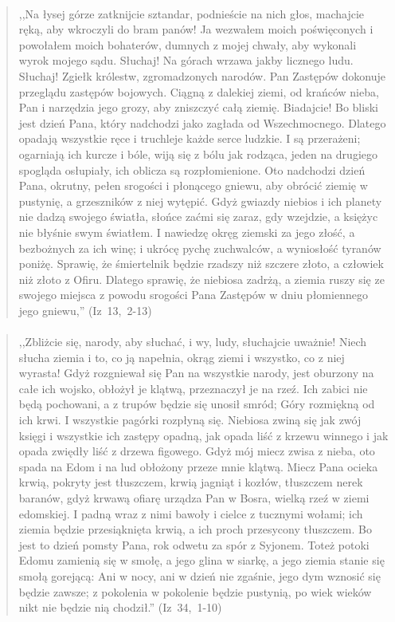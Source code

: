 \documentclass[10pt,a4paper,oneside]{article}
\begin{document}
\paragraph{}
\begin{quote}
,,Na łysej górze zatknijcie sztandar, podnieście na nich głos, machajcie ręką, aby wkroczyli do bram panów! Ja wezwałem moich poświęconych i powołałem moich bohaterów, dumnych z mojej chwały, aby wykonali wyrok mojego sądu. Słuchaj! Na górach wrzawa jakby licznego ludu. Słuchaj! Zgiełk królestw, zgromadzonych narodów. Pan Zastępów dokonuje przeglądu zastępów bojowych. Ciągną z dalekiej ziemi, od krańców nieba, Pan i narzędzia jego grozy, aby zniszczyć całą ziemię. Biadajcie! Bo bliski jest dzień Pana, który nadchodzi jako zagłada od Wszechmocnego. Dlatego opadają wszystkie ręce i truchleje każde serce ludzkie. I są przerażeni; ogarniają ich kurcze i bóle, wiją się z bólu jak rodząca, jeden na drugiego spogląda osłupiały, ich oblicza są rozpłomienione. Oto nadchodzi dzień Pana, okrutny, pełen srogości i płonącego gniewu, aby obrócić ziemię w pustynię, a grzeszników z niej wytępić. Gdyż gwiazdy niebios i ich planety nie dadzą swojego światła, słońce zaćmi się zaraz, gdy wzejdzie, a księżyc nie błyśnie swym światłem. I nawiedzę okręg ziemski za jego złość, a bezbożnych za ich winę; i ukrócę pychę zuchwalców, a wyniosłość tyranów poniżę. Sprawię, że śmiertelnik będzie rzadszy niż szczere złoto, a człowiek niż złoto z Ofiru. Dlatego sprawię, że niebiosa zadrżą, a ziemia ruszy się ze swojego miejsca z powodu srogości Pana Zastępów w dniu płomiennego jego gniewu,'' \mbox{(Iz 13, 2-13)}
\end{quote}
\paragraph{}
\begin{quote}
,,Zbliżcie się, narody, aby słuchać, i wy, ludy, słuchajcie uważnie! Niech słucha ziemia i to, co ją napełnia, okrąg ziemi i wszystko, co z niej wyrasta! Gdyż rozgniewał się Pan na wszystkie narody, jest oburzony na całe ich wojsko, obłożył je klątwą, przeznaczył je na rzeź. Ich zabici nie będą pochowani, a z trupów będzie się unosił smród; Góry rozmiękną od ich krwi. I wszystkie pagórki rozpłyną się. Niebiosa zwiną się jak zwój księgi i wszystkie ich zastępy opadną, jak opada liść z krzewu winnego i jak opada zwiędły liść z drzewa figowego. Gdyż mój miecz zwisa z nieba, oto spada na Edom i na lud obłożony przeze mnie klątwą. Miecz Pana ocieka krwią, pokryty jest tłuszczem, krwią jagniąt i kozłów, tłuszczem nerek baranów, gdyż krwawą ofiarę urządza Pan w Bosra, wielką rzeź w ziemi edomskiej. I padną wraz z nimi bawoły i cielce z tucznymi wołami; ich ziemia będzie przesiąknięta krwią, a ich proch przesycony tłuszczem. Bo jest to dzień pomsty Pana, rok odwetu za spór z Syjonem. Toteż potoki Edomu zamienią się w smołę, a jego glina w siarkę, a jego ziemia stanie się smołą gorejącą: Ani w nocy, ani w dzień nie zgaśnie, jego dym wznosić się będzie zawsze; z pokolenia w pokolenie będzie pustynią, po wiek wieków nikt nie będzie nią chodził.'' \mbox{(Iz 34, 1-10)}
\end{quote}
\end{document}
